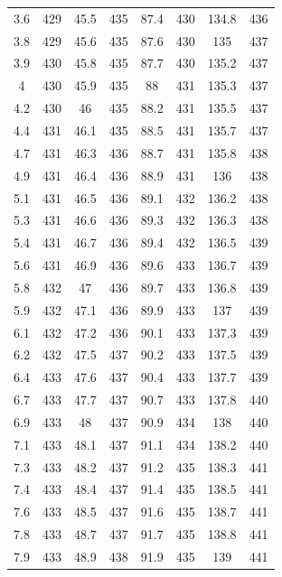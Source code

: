 \documentclass[12pt]{ctexart}
\numberwithin{equation}{section}
\begin{document}
\begin{longtable}{cc|cc|cc|cc}
3.6  &  429  &  45.5  &  435  &  87.4  &  430  &  134.8  &  436  \\
3.8  &  429  &  45.6  &  435  &  87.6  &  430  &  135  &  437  \\
3.9  &  430  &  45.8  &  435  &  87.7  &  430  &  135.2  &  437  \\
4  &  430  &  45.9  &  435  &  88  &  431  &  135.3  &  437  \\
4.2  &  430  &  46  &  435  &  88.2  &  431  &  135.5  &  437  \\
4.4  &  431  &  46.1  &  435  &  88.5  &  431  &  135.7  &  437  \\
4.7  &  431  &  46.3  &  436  &  88.7  &  431  &  135.8  &  438  \\
4.9  &  431  &  46.4  &  436  &  88.9  &  431  &  136  &  438  \\
5.1  &  431  &  46.5  &  436  &  89.1  &  432  &  136.2  &  438  \\
5.3  &  431  &  46.6  &  436  &  89.3  &  432  &  136.3  &  438  \\
5.4  &  431  &  46.7  &  436  &  89.4  &  432  &  136.5  &  439  \\
5.6  &  431  &  46.9  &  436  &  89.6  &  433  &  136.7  &  439  \\
5.8  &  432  &  47  &  436  &  89.7  &  433  &  136.8  &  439  \\
5.9  &  432  &  47.1  &  436  &  89.9  &  433  &  137  &  439  \\
6.1  &  432  &  47.2  &  436  &  90.1  &  433  &  137.3  &  439  \\
6.2  &  432  &  47.5  &  437  &  90.2  &  433  &  137.5  &  439  \\
6.4  &  433  &  47.6  &  437  &  90.4  &  433  &  137.7  &  439  \\
6.7  &  433  &  47.7  &  437  &  90.7  &  433  &  137.8  &  440  \\
6.9  &  433  &  48  &  437  &  90.9  &  434  &  138  &  440  \\
7.1  &  433  &  48.1  &  437  &  91.1  &  434  &  138.2  &  440  \\
7.3  &  433  &  48.2  &  437  &  91.2  &  435  &  138.3  &  441  \\
7.4  &  433  &  48.4  &  437  &  91.4  &  435  &  138.5  &  441  \\
7.6  &  433  &  48.5  &  437  &  91.6  &  435  &  138.7  &  441  \\
7.8  &  433  &  48.7  &  437  &  91.7  &  435  &  138.8  &  441  \\
7.9  &  433  &  48.9  &  438  &  91.9  &  435  &  139  &  441  \\

\end{longtable}
\end{document}
